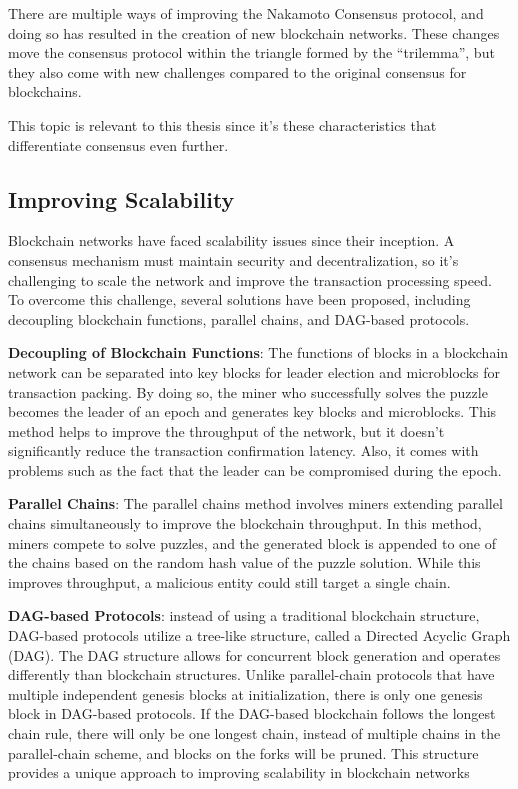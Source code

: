 There are multiple ways of improving the Nakamoto Consensus protocol, and doing so has resulted in the creation of new blockchain networks. These changes move the consensus protocol within the triangle formed by the ``trilemma'', but they also come with new challenges compared to the original consensus for blockchains.

This topic is relevant to this thesis since it's these characteristics that differentiate consensus even further.

\subsection*{Improving Scalability}
Blockchain networks have faced scalability issues since their inception. A consensus mechanism must maintain security and decentralization, so it's challenging to scale the network and improve the transaction processing speed. To overcome this challenge, several solutions have been proposed, including decoupling blockchain functions, parallel chains, and DAG-based protocols.

\textbf{Decoupling of Blockchain Functions}: The functions of blocks in a blockchain network can be separated into key blocks for leader election and microblocks for transaction packing. By doing so, the miner who successfully solves the puzzle becomes the leader of an epoch and generates key blocks and microblocks. This method helps to improve the throughput of the network, but it doesn't significantly reduce the transaction confirmation latency. Also, it comes with problems such as the fact that the leader can be compromised during the epoch.

\textbf{Parallel Chains}: The parallel chains method involves miners extending parallel chains simultaneously to improve the blockchain throughput. In this method, miners compete to solve puzzles, and the generated block is appended to one of the chains based on the random hash value of the puzzle solution. While this improves throughput, a malicious entity could still target a single chain.

\textbf{DAG-based Protocols}: instead of using a traditional blockchain structure, DAG-based protocols utilize a tree-like structure, called a Directed Acyclic Graph (DAG). The DAG structure allows for concurrent block generation and operates differently than blockchain structures. Unlike parallel-chain protocols that have multiple independent genesis blocks at initialization, there is only one genesis block in DAG-based protocols. If the DAG-based block\-chain follows the longest chain rule, there will only be one longest chain, instead of multiple chains in the parallel-chain scheme, and blocks on the forks will be pruned. This structure provides a unique approach to improving scalability in blockchain networks 

